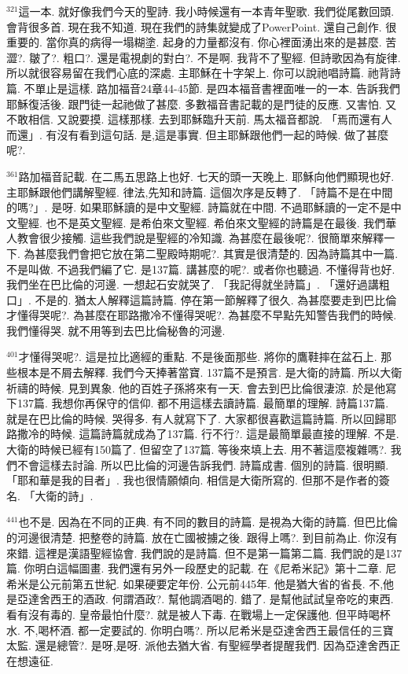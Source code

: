\documentclass{book}
\begin{document}
$^{321}$這一本.
就好像我們今天的聖詩.
我小時候還有一本青年聖歌.
我們從尾數回頭.
會背很多首.
現在我不知道.
現在我們的詩集就變成了PowerPoint.
還自己創作.
很重要的.
當你真的病得一塌糊塗.
起身的力量都沒有.
你心裡面湧出來的是甚麼.
苦澀?.
皺了?.
粗口?.
還是電視劇的對白?.
不是啊.
我背不了聖經.
但詩歌因為有旋律.
所以就很容易留在我們心底的深處.
主耶穌在十字架上.
你可以說祂唱詩篇.
祂背詩篇.
不單止是這樣.
路加福音24章44-45節.
是四本福音書裡面唯一的一本.
告訴我們耶穌復活後.
跟門徒一起祂做了甚麼.
多數福音書記載的是門徒的反應.
又害怕.
又不敢相信.
又說要摸.
這樣那樣.
去到耶穌臨升天前.
馬太福音都說.
「焉而還有人而還」.
有沒有看到這句話.
是,這是事實.
但主耶穌跟他們一起的時候.
做了甚麼呢?.

$^{361}$路加福音記載.
在二馬五思路上也好.
七天的頭一天晚上.
耶穌向他們顯現也好.
主耶穌跟他們講解聖經.
律法,先知和詩篇.
這個次序是反轉了.
「詩篇不是在中間的嗎?」.
是呀.
如果耶穌讀的是中文聖經.
詩篇就在中間.
不過耶穌讀的一定不是中文聖經.
也不是英文聖經.
是希伯來文聖經.
希伯來文聖經的詩篇是在最後.
我們華人教會很少接觸.
這些我們說是聖經的冷知識.
為甚麼在最後呢?.
很簡單來解釋一下.
為甚麼我們會把它放在第二聖殿時期呢?.
其實是很清楚的.
因為詩篇其中一篇.
不是叫做.
不過我們編了它.
是137篇.
講甚麼的呢?.
或者你也聽過.
不懂得背也好.
我們坐在巴比倫的河邊.
一想起石安就哭了.
「我記得就坐詩篇」.
「還好過講粗口」.
不是的.
猶太人解釋這篇詩篇.
停在第一節解釋了很久.
為甚麼要走到巴比倫才懂得哭呢?.
為甚麼在耶路撒冷不懂得哭呢?.
為甚麼不早點先知警告我們的時候.
我們懂得哭.
就不用等到去巴比倫秘魯的河邊.

$^{401}$才懂得哭呢?.
這是拉比適經的重點.
不是後面那些.
將你的鷹鞋摔在盆石上.
那些根本是不屑去解釋.
我們今天捧著當寶.
137篇不是預言.
是大衛的詩篇.
所以大衛祈禱的時候.
見到異象.
他的百姓子孫將來有一天.
會去到巴比倫很淒涼.
於是他寫下137篇.
我想你再保守的信仰.
都不用這樣去讀詩篇.
最簡單的理解.
詩篇137篇.
就是在巴比倫的時候.
哭得多.
有人就寫下了.
大家都很喜歡這篇詩篇.
所以回歸耶路撒冷的時候.
這篇詩篇就成為了137篇.
行不行?.
這是最簡單最直接的理解.
不是.
大衛的時候已經有150篇了.
但留空了137篇.
等後來填上去.
用不著這麼複雜嗎?.
我們不會這樣去討論.
所以巴比倫的河邊告訴我們.
詩篇成書.
個別的詩篇.
很明顯.
「耶和華是我的目者」.
我也很情願傾向.
相信是大衛所寫的.
但那不是作者的簽名.
「大衛的詩」.

$^{441}$也不是.
因為在不同的正典.
有不同的數目的詩篇.
是視為大衛的詩篇.
但巴比倫的河邊很清楚.
把整卷的詩篇.
放在亡國被擄之後.
跟得上嗎?.
到目前為止.
你沒有來錯.
這裡是漢語聖經協會.
我們說的是詩篇.
但不是第一篇第二篇.
我們說的是137篇.
你明白這幅圖畫.
我們還有另外一段歷史的記載.
在《尼希米記》第十二章.
尼希米是公元前第五世紀.
如果硬要定年份.
公元前445年.
他是猶大省的省長.
不,他是亞達舍西王的酒政.
何謂酒政?.
幫他調酒喝的.
錯了.
是幫他試試皇帝吃的東西.
看有沒有毒的.
皇帝最怕什麼?.
就是被人下毒.
在戰場上一定保護他.
但平時喝杯水.
不,喝杯酒.
都一定要試的.
你明白嗎?.
所以尼希米是亞達舍西王最信任的三寶太監.
還是總管?.
是呀,是呀.
派他去猶大省.
有聖經學者提醒我們.
因為亞達舍西正在想遠征.
\end{document}
